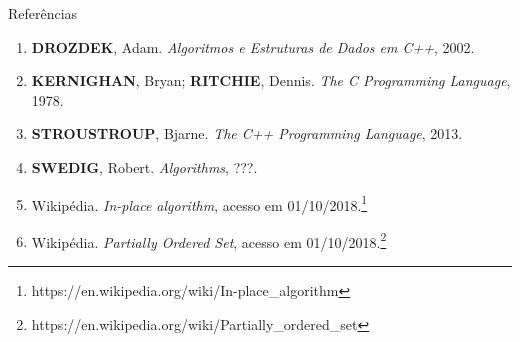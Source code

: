 \begin{frame}[fragile]{Referências}

    \begin{enumerate}
        \item \textbf{DROZDEK}, Adam. \textit{Algoritmos e Estruturas de Dados em C++}, 2002.

        \item \textbf{KERNIGHAN}, Bryan; \textbf{RITCHIE}, Dennis. \textit{The C Programming Language}, 1978.

        \item \textbf{STROUSTROUP}, Bjarne. \textit{The C++ Programming Language}, 2013.

        \item \textbf{SWEDIG}, Robert. \textit{Algorithms}, ???.

        \item Wikipédia. \textit{In-place algorithm}, acesso em 01/10/2018.\footnote{https://en.wikipedia.org/wiki/In-place\_algorithm}

        \item Wikipédia. \textit{Partially Ordered Set}, acesso em 01/10/2018.\footnote{https://en.wikipedia.org/wiki/Partially\_ordered\_set}

    \end{enumerate}

\end{frame}
